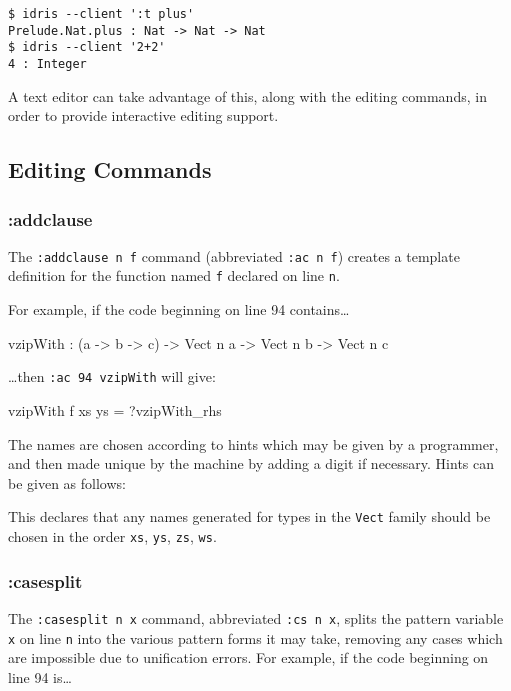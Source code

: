 \begin{lstlisting}
$ idris --client ':t plus'
Prelude.Nat.plus : Nat -> Nat -> Nat
$ idris --client '2+2'
4 : Integer
\end{lstlisting}

\noindent
A text editor can take advantage of this, along with the editing commands,
in order to provide interactive editing support.

\subsection{Editing Commands}

\subsubsection{:addclause}

The \texttt{:addclause n f} command (abbreviated \texttt{:ac n f}) creates a
template definition for the function named \texttt{f} declared on line
\texttt{n}.

For example, if the code beginning on line 94 contains\ldots

\begin{code}
vzipWith : (a -> b -> c) -> 
           Vect n a -> Vect n b -> Vect n c
\end{code}

\ldots then \texttt{:ac 94 vzipWith} will give:

\begin{code}
vzipWith f xs ys = ?vzipWith_rhs
\end{code}

\noindent
The names are chosen according to hints which may be given by a programmer,
and then made unique by the machine by adding a digit if necessary. Hints
can be given as follows:

\begin{code}
\end{code}

\noindent
This declares that any names generated for types in the \texttt{Vect} family
should be chosen in the order \texttt{xs}, \texttt{ys}, \texttt{zs},
\texttt{ws}.

\subsubsection{:casesplit}

The \texttt{:casesplit n x} command, abbreviated \texttt{:cs n x}, splits
the pattern variable \texttt{x} on line \texttt{n} into the various pattern
forms it may take, removing any cases which are impossible due to unification
errors. For example, if the code beginning on line 94 is\ldots

